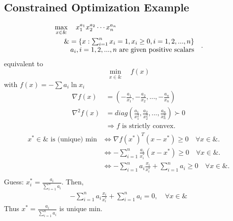 \documentclass[11pt,a4paper]{article}
\begin{document}
\subsection{Constrained Optimization Example}
\begin{align*}
    &\max_{x\in\&}\quad x_1^{a_1}x_2^{a_2}\cdots x_n^{a_n}\\
    &\begin{array}{r@{\quad}r@{}l@{\quad}l}
    &\&=\{x:\sum_{i=1}^nx_i=1,x_i\geq 0,i=1,2,...,n\} &\\
    &a_i,i=1,2,...,n \text{ are given positive scalars}&\\
\end{array} .
\end{align*}
equivalent to $$\min_{x\in\&}\quad f(x)$$ with $f(x)=-\sum a_i\ln x_i$
\begin{equation}
    \begin{aligned}
        \nabla f(x)&=\left(-\frac{a_1}{x_1},-\frac{a_2}{x_2},...,-\frac{a_n}{x_n}\right)\\
        \nabla^2 f(x)&=diag\left(\frac{a_1}{x^2_1},\frac{a_2}{x^2_2},...,\frac{a_n}{x^2_n}\right)\succ 0\\
        &\Rightarrow f\text{ is strictly convex}.
    \end{aligned}
    \nonumber
\end{equation}
\begin{equation}
    \begin{aligned}
        x^*\in\&\text{ is (unique) min}&\Leftrightarrow \nabla f(x^*)^T(x-x^*)\geq 0\quad \forall x\in\&.\\
        &\Leftrightarrow -\sum_{i=1}^n\frac{a_i}{x_i^*}(x-x^*)\geq 0\quad \forall x\in\&.\\
        &\Leftrightarrow -\sum_{i=1}^na_i\frac{x_i}{x_i^*}+\sum_{i=1}^na_i\geq 0\quad \forall x\in\&.\\
    \end{aligned}
    \nonumber
\end{equation}
Guess: $x^*_i=\frac{a_i}{\sum_{i=1}^na_i}$. Then,
\begin{equation}
    \begin{aligned}
        -\sum_{i=1}^n a_i\frac{x_i}{x_i^*}+\sum_{i=1}^na_i=0,\quad \forall x\in\&
    \end{aligned}
    \nonumber
\end{equation}
Thus $x^*=\frac{a_i}{\sum_{i=1}^na_i}$ is unique min.
\end{document}
